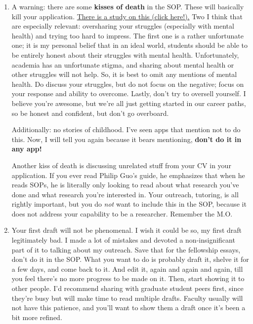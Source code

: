 \documentclass[12pt]{article}
\begin{document}
\begin{enumerate}
	\item A warning: there are some \textbf{kisses of death} in the SOP. These will basically kill your application. \href{https://psychology.unl.edu/psichi/Graduate_School_Application_Kisses_of_Death.pdf}{There is a study on this (click here!).} Two I think that are especially relevant: oversharing your struggles (especially with mental health) and trying too hard to impress. The first one is a rather unfortunate one; it is my personal belief that in an ideal world, students should be able to be entirely honest about their struggles with mental health. Unfortunately, academia has an unfortunate stigma, and sharing about mental health or other struggles will not help. So, it is best to omit any mentions of mental health. Do discuss your struggles, but do not focus on the negative; focus on your response and ability to overcome. Lastly, don't try to oversell yourself. I believe you're awesome, but we're all just getting started in our career paths, so be honest and confident, but don't go overboard.

	Additionally: no stories of childhood. I've seen apps that mention not to do this. Now, I will tell you again because it bears mentioning, \textbf{don't do it in any app!}

	Another kiss of death is discussing unrelated stuff from your CV in your application. If you ever read Philip Guo's guide, he emphasizes that when he reads SOPs, he is literally only looking to read about what research you've done and what research you're interested in. Your outreach, tutoring, is all rightly important, but you do \textit{not} want to include this in the SOP, because it does not address your capability to be a researcher. Remember the M.O.

	\item Your first draft will not be phenomenal. I wish it could be so, my first draft legitimately bad. I made a lot of mistakes and devoted a non-insignificant part of it to talking about my outreach. Save that for the fellowship essays, don't do it in the SOP. What you want to do is probably draft it, shelve it for a few days, and come back to it. And edit it, again and again and again, till you feel there's no more progress to be made on it. Then, start showing it to other people. I'd recommend sharing with graduate student peers first, since they're busy but will make time to read multiple drafts. Faculty usually will not have this patience, and you'll want to show them a draft once it's been a bit more refined.


\end{enumerate}
\end{document}
